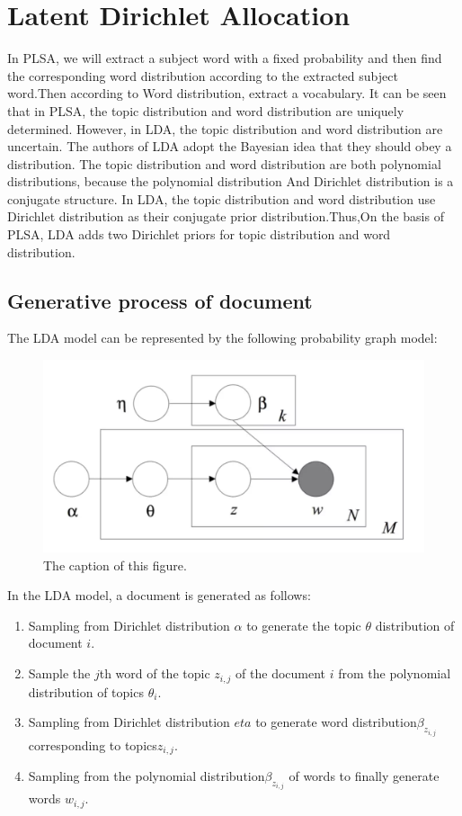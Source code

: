 \section{Latent Dirichlet Allocation}
In PLSA, we will extract a subject word with a fixed probability and then find the corresponding word distribution according to the extracted subject word.Then according to Word distribution, extract a vocabulary.
It can be seen that in PLSA, the topic distribution and word distribution are uniquely determined. However, in LDA, the topic distribution and word distribution are uncertain. The authors of LDA adopt the Bayesian idea that they should obey a distribution. The topic distribution and word distribution are both polynomial distributions, because the polynomial distribution And Dirichlet distribution is a conjugate structure. In LDA, the topic distribution and word distribution use Dirichlet distribution as their conjugate prior distribution.Thus,On the basis of PLSA, LDA adds two Dirichlet priors for topic distribution and word distribution.
\subsection{Generative process of document}
The LDA model can be represented by the following probability graph model:
\begin{figure}[htbp]
\includegraphics[width = 15cm]{lda.png}
\caption{The caption of this figure.}
\label{fig:figure1label}
\end{figure}


In the LDA model, a document is generated as follows:
\begin{enumerate}
  \item Sampling from Dirichlet distribution $\alpha$ to generate the topic $\theta$ distribution of document $i$.

  \item Sample the $j$th word of the topic $z_{i,j}$  of the document $i$ from the polynomial distribution of topics $\theta_i$.

  \item Sampling from Dirichlet distribution $eta$ to generate word distribution$\beta_{z_{i,j}}$ corresponding to topics$z_{i,j}$.

  \item Sampling from the polynomial distribution$\beta_{z_{i,j}}$  of words to finally generate words $w_{i,j}$.

\end{enumerate}


